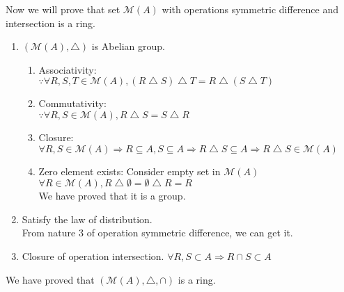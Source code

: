 \documentclass[12pt]{article}
\theoremstyle{neosn}
\begin{document}
    Now we will prove that set $\mathscr{M}(A)$ with operations symmetric difference and intersection is a ring.\\
    \begin{enumerate}
        \item $(\mathscr{M}(A),\bigtriangleup)$ is Abelian group.\\
            \begin{enumerate}
                \item Associativity:\\
                    $\because \forall R,S,T \in \mathscr{M}(A), (R\bigtriangleup S)\bigtriangleup T =  R\bigtriangleup (S\bigtriangleup T)$\\
                \item Commutativity:\\
                    $\because \forall R,S \in \mathscr{M}(A), R\bigtriangleup S = S \bigtriangleup R$\\
                \item Closure:\\
                    $\forall R,S \in \mathscr{M}(A) \Rightarrow R \subseteq A, S \subseteq A \Rightarrow R\bigtriangleup S \subseteq A
                    \Rightarrow R\bigtriangleup S \in \mathscr{M}(A)$
                \item Zero element exists:
                    Consider empty set in $\mathscr{M}(A)$\\
                    $\forall R \in \mathscr{M}(A), R \bigtriangleup \emptyset = \emptyset \bigtriangleup R = R$\\
                We have proved that it is a group.    
            \end{enumerate}

        \item Satisfy the law of distribution.\\
           From nature 3 of operation symmetric difference, we can get it.
        
        \item  Closure of operation intersection.
            $\forall R,S \subset A \Rightarrow R \cap S \subset A$
    \end{enumerate}

    We have proved that $(\mathscr{M}(A),\bigtriangleup,\cap)$ is a ring.

    
\end{document}
